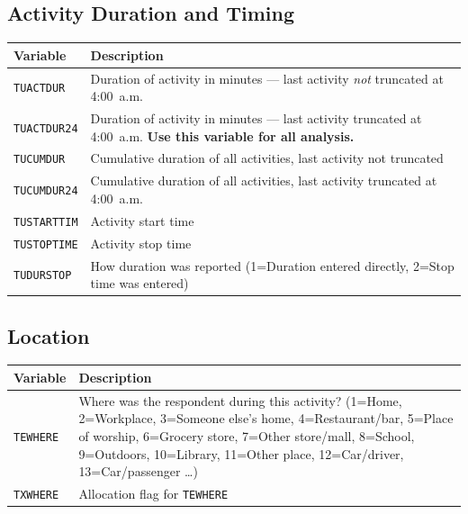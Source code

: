 \documentclass[11pt, a4paper]{article}
\begin{document}
\subsection{Activity Duration and Timing}
\begin{longtable}{L{3.5cm} L{12cm}}
\toprule \textbf{Variable} & \textbf{Description} \\ \midrule \endhead
\bottomrule \endfoot
\texttt{TUACTDUR}    & Duration of activity in minutes --- last activity
                       \emph{not} truncated at 4:00~a.m. \\
 \texttt{TUACTDUR24}  & Duration of activity in minutes --- last activity
                       truncated at 4:00~a.m. \textbf{Use this variable for
                       all analysis.} \\
\texttt{TUCUMDUR}    & Cumulative duration of all activities, last activity not truncated \\
 \texttt{TUCUMDUR24}  & Cumulative duration of all activities, last activity
                       truncated at 4:00~a.m. \\
\texttt{TUSTARTTIM}  & Activity start time \\
 \texttt{TUSTOPTIME}  & Activity stop time \\
\texttt{TUDURSTOP}   & How duration was reported (1=Duration entered directly,
                       2=Stop time was entered) \\
\end{longtable}



\vspace{6cm}



\subsection{Location}
\begin{longtable}{L{3.5cm} L{12cm}}
\toprule \textbf{Variable} & \textbf{Description} \\ \midrule \endhead
\bottomrule \endfoot
\texttt{TEWHERE}  & Where was the respondent during this activity?
  (1=Home, 2=Workplace, 3=Someone else's home, 4=Restaurant/bar,
   5=Place of worship, 6=Grocery store, 7=Other store/mall,
   8=School, 9=Outdoors, 10=Library, 11=Other place,
   12=Car/driver, 13=Car/passenger \ldots) \\
 \texttt{TXWHERE}  & Allocation flag for \texttt{TEWHERE} \\
\end{longtable}
\end{document}
